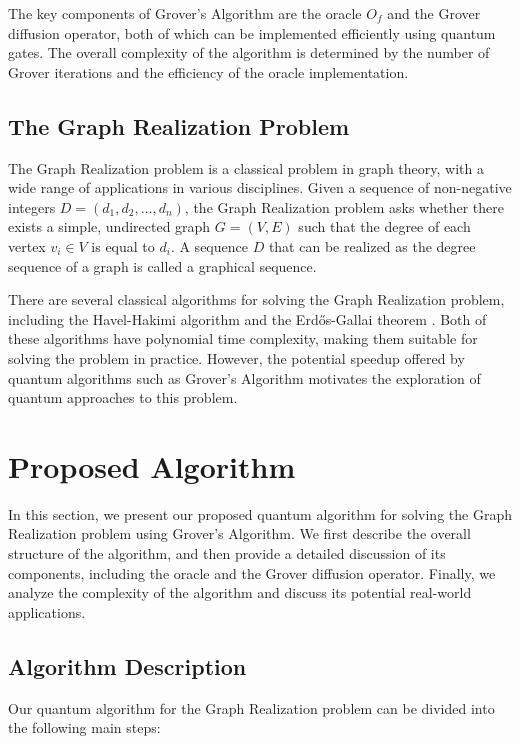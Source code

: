 The key components of Grover's Algorithm are the oracle $O_f$ and the Grover diffusion operator, both of which can be implemented efficiently using quantum gates. The overall complexity of the algorithm is determined by the number of Grover iterations and the efficiency of the oracle implementation.

\subsection{The Graph Realization Problem}

The Graph Realization problem is a classical problem in graph theory, with a wide range of applications in various disciplines. Given a sequence of non-negative integers $D = (d_1, d_2, \ldots, d_n)$, the Graph Realization problem asks whether there exists a simple, undirected graph $G = (V, E)$ such that the degree of each vertex $v_i \in V$ is equal to $d_i$. A sequence $D$ that can be realized as the degree sequence of a graph is called a graphical sequence.

There are several classical algorithms for solving the Graph Realization problem, including the Havel-Hakimi algorithm \cite{havel1955remark,hakimi1962realization} and the Erdős-Gallai theorem \cite{erdos1960graphs}. Both of these algorithms have polynomial time complexity, making them suitable for solving the problem in practice. However, the potential speedup offered by quantum algorithms such as Grover's Algorithm motivates the exploration of quantum approaches to this problem.

\section{Proposed Algorithm}
\label{sec:algorithm}

In this section, we present our proposed quantum algorithm for solving the Graph Realization problem using Grover's Algorithm. We first describe the overall structure of the algorithm, and then provide a detailed discussion of its components, including the oracle and the Grover diffusion operator. Finally, we analyze the complexity of the algorithm and discuss its potential real-world applications.

\subsection{Algorithm Description}

Our quantum algorithm for the Graph Realization problem can be divided into the following main steps:

